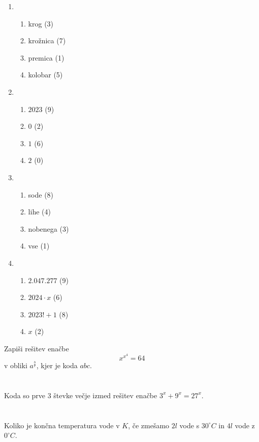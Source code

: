 \documentclass[a4paper]{article}
\begin{document}
\begin{enumerate}
    \item\begin{enumerate}
    \item    krog  (3)
    \item krožnica (7)
    \item premica (1)
    \item kolobar (5)
    \end{enumerate}
    \item\begin{enumerate}
        \item  $2023$  (9)  
        \item $0$  (2)
        \item $1$ (6)
        \item $2$ (0)
    \end{enumerate}
    \item \begin{enumerate}
        \item      sode (8)
            \item lihe (4)
            \item nobenega (3)
            \item vse (1)
            \end{enumerate}
          \item  \begin{enumerate}
                \item $2.047.277$  (9)    
                \item $2024\cdot x$ (6)
                \item $2023!+1$ (8)
                \item $x$ (2)
                \end{enumerate}
\end{enumerate}
\newpage
Zapiši rešitev enačbe
\[x^{x^4}=64\]
v obliki \(a^{\frac{b}{c}}\), kjer je koda \(abc\).\\
\\
\\



Koda so prve 3 števke večje izmed rešitev enačbe
\(3^x + 9^x=27^x\).\\
\\
\\


Koliko je končna temperatura vode v $K$, če zmešamo $2l$ vode s $30^{\circ}C$ in $4l$ vode z $0^{\circ}C$.\\
\\
\\
\end{document}
